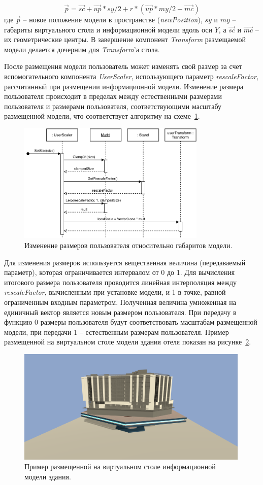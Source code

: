 \[
    \vec{p} = \vec{sc} +
    \vec{up} * sy / 2 +
    r * (
        \vec{up} * my / 2 - \vec{mc}
    )
\]
где $\vec{p}$ -- новое положение модели в пространстве (\emph{newPosition}),
$sy$ и $my$ -- габариты виртуального стола и информационной модели
вдоль оси $Y$, а $\vec{sc}$ и $\vec{mc}$ -- их геометрические центры.
В завершение компонент \emph{Transform} размещаемой модели
делается дочерним для \emph{Transform}'а стола.

После размещения модели пользователь может изменять свой размер
за счет вспомогательного компонента \emph{UserScaler},
использующего параметр \emph{rescaleFactor}, рассчитанный
при размещении информационной модели. Изменение размера пользователя
происходит в пределах между естественными размерами пользователя
и размерами пользователя, соответствующими масштабу размещенной модели,
что соответствует алгоритму на схеме~\ref{figure:SSetUserSize}.

\begin{figure}[!htp]
    \centering
    \includegraphics[width=0.8\textwidth]{images/UML-SSetUserSize.pdf}
    \caption{Изменение размеров пользователя
    относительно габаритов модели.}
    \label{figure:SSetUserSize}
\end{figure}

Для изменения размеров используется вещественная величина
(передаваемый параметр), которая ограничивается интервалом от 0 до 1.
Для вычисления итогового размера пользователя
проводится линейная интерполяция между \emph{rescaleFactor},
вычисленным при установке модели, и 1 в точке, равной
ограниченным входным параметром.
Полученная величина умноженная на единичный вектор
является новым размером пользователя.
При передачу в функцию 0 размеры пользователя будут
соответствовать масштабам размещенной модели,
при передачи 1 -- естественным размерам пользователя.
Пример размещенной на виртуальном столе модели здания отеля
показан на рисунке~\ref{figure:PlacedModelExample}.

\begin{figure}[!htp]
    \centering
    \includegraphics[width=0.99\textwidth, frame]{images/PlacedModelExample.png}
    \caption{Пример размещенной на виртуальном столе
    информационной модели здания.}
    \label{figure:PlacedModelExample}
\end{figure}

